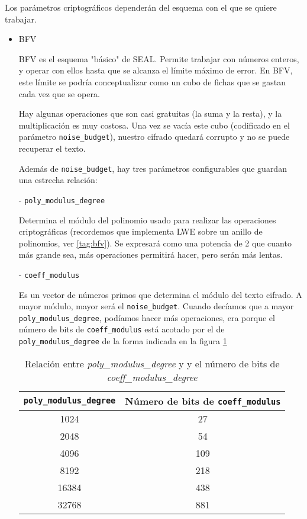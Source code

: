 Los parámetros criptográficos dependerán del esquema con el que se quiere trabajar.

\begin{itemize}

  \item BFV

  BFV es el esquema "básico" de SEAL. Permite trabajar con números enteros, y operar con ellos hasta que se alcanza el límite máximo de error. En BFV, este límite se podría conceptualizar como un cubo de fichas que se gastan cada vez que se opera.

  Hay algunas operaciones que son casi gratuitas (la suma y la resta), y la multiplicación es muy costosa. Una vez se vacía este cubo (codificado en el parámetro \verb|noise_budget|), nuestro cifrado quedará corrupto y no se puede recuperar el texto.

  Además de \verb|noise_budget|, hay tres parámetros configurables que guardan una estrecha relación:

  - \verb|poly_modulus_degree|

  Determina el módulo del polinomio usado para realizar las operaciones criptográficas (recordemos que implementa LWE sobre un anillo de polinomios, ver \ref{tag:bfv}). Se expresará como una potencia de 2 que cuanto más grande sea, más operaciones permitirá hacer, pero serán más lentas.

  - \verb|coeff_modulus|

  Es un vector de números primos que determina el módulo del texto cifrado. A mayor módulo, mayor será el \verb|noise_budget|. Cuando decíamos que a mayor \verb|poly_modulus_degree|, podíamos hacer más operaciones, era porque el número de bits de \verb|coeff_modulus| está acotado por el de \verb|poly_modulus_degree| de la forma indicada en la figura \ref{table:poly_vs_coeff_modulus}

    \begin{table}
        \centering
        \begin{subtable}
            \centering
            \begin{tabular}{  c  c  }
                \hline
                \verb|poly_modulus_degree|  & Número de bits de \verb|coeff_modulus| \\ [0.5ex]
                \hline
                \hline
                1024  & 27  \\
                2048  & 54  \\
                4096  & 109 \\
                8192  & 218 \\
                16384 & 438 \\
                32768 & 881 \\ [1ex]
                \hline
            \end{tabular}
      \end{subtable}
       \caption{Relación entre \textit{poly\_modulus\_degree} y y el número de bits de \textit{coeff\_modulus\_degree}}\label{table:poly_vs_coeff_modulus}


\end{table}
\end{itemize}
